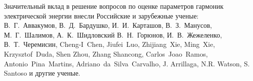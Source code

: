 Значительный вклад в решение вопросов по оценке параметров гармоник электрической энергии внесли Российские и зарубежные ученые:
В.~Г.~Аввакумов, В.~Д.~Бардушко, И.~И.~Карташов, В.~З.~Манусов, М.~Г.~Шалимов, А.~К.~Шидловский
В.~Н.~Горюнов, 
И.~В.~Жежеленко,
В.~Т.~Черемисин,
Cheng-I~Chen,
Jiufei~Luo, Zhijiang~Xie, Ming~Xie,
Krzysztof~Duda,
Shen Zhou, Zhang Shancong,
Carlos~Joao~Ramos, Antonio~Pina~Martins, Adriano~da~Silva~Carvalho, 
J. Arrillaga, N.R. Watson, S. Santoso и другие ученые.

